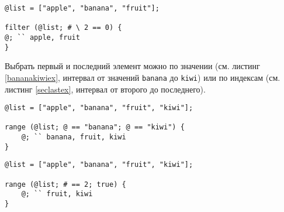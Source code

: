 \begin{sourcecode}
\label{filterindexex}
\begin{verbatim}
@list = ["apple", "banana", "fruit"];

filter (@list; # \ 2 == 0) {
@; `` apple, fruit
}
\end{verbatim}
\end{sourcecode}

Выбрать первый и последний элемент можно по значении (см. листинг \ref{bananakiwiex}, интервал от значений \texttt{banana} до \texttt{kiwi}) или по индексам (см. листинг \ref{seclastex}, интервал от второго до последнего).

\begin{sourcecode}
\label{bananakiwiex}
\begin{verbatim}
@list = ["apple", "banana", "fruit", "kiwi"];

range (@list; @ == "banana"; @ == "kiwi") {
	@; `` banana, fruit, kiwi
}
\end{verbatim}
\end{sourcecode}

\begin{sourcecode}
\label{seclastex}
\begin{verbatim}
@list = ["apple", "banana", "fruit", "kiwi"];

range (@list; # == 2; true) {
	@; `` fruit, kiwi
}
\end{verbatim}
\end{sourcecode}

